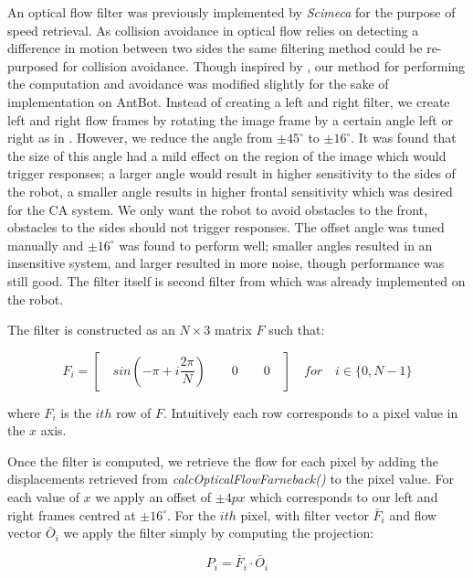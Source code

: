 \documentclass[a4paper,12pt,twoside,openright]{article}
\begin{document}
An optical flow filter was previously implemented by \textit{Scimeca} for the purpose of speed retrieval. 
As collision avoidance in optical flow relies on detecting a difference in motion between two sides
the same filtering method could be re-purposed for collision avoidance. Though inspired by \cite{Stewart2010},
our method for performing the computation and avoidance was modified slightly for the sake of
implementation on AntBot. Instead of creating
a left and right filter, we create left and right flow frames by rotating the image frame
by a certain angle left or right as in \cite{Scimeca2017}. However, we reduce the angle from $\pm 45^{\circ}$
\cite{Scimeca2017} to $\pm 16^{\circ}$. It was found that the size of this angle had a mild effect on the region of the 
image which would trigger responses; a larger angle would result in higher sensitivity to the sides of the
robot, a smaller angle results in higher frontal sensitivity which was desired for the CA system. We only
want the robot to avoid obstacles to the front, obstacles to the sides should not trigger responses. The offset
angle was tuned manually and $\pm 16^{\circ}$ was found to perform well; smaller angles resulted in
an insensitive system, and larger resulted in more noise, though performance was still good. The filter
itself is second filter from \cite{Scimeca2017} which was already implemented on the robot.
\newline

The filter is constructed as an $N \times 3$ matrix $F$ such that:

\begin{equation}
F_i = [ \quad sin(-\pi + i\frac{2\pi}{N}) \qquad 0 \qquad 0 \quad ] \quad \textit{for} \quad i \in \{0, N - 1\}
\end{equation}

where $F_i$ is the $ith$ row of $F$. Intuitively each row corresponds to a pixel value in the $x$ axis.
\newline

Once the filter is computed, we retrieve the flow for each pixel by adding the displacements
retrieved from \textit{calcOpticalFlowFarneback()} to the pixel value. 
For each value of $x$ we apply an offset of $\pm 4px$ which corresponds to our left and right frames centred at
$\pm 16^{\circ}$. For the $ith$ pixel, with filter vector $\bar F_i$ and flow vector $\bar O_i$ we apply the filter
simply by computing the projection:

\begin{equation}
  P_i = \bar F_i \cdot \bar O_i
\end{equation}
\end{document}
